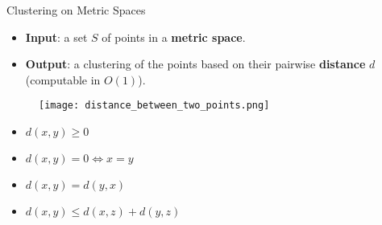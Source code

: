 \documentclass[aspectratio=169]{beamer}
\begin{document}
\begin{frame}{Clustering on Metric Spaces}

    \begin{itemize}
        \item \textbf{Input}: a set $S$ of points in a \textbf{metric space}.
        \item \textbf{Output}: a clustering of the points based on their pairwise \textbf{distance} $d$ (computable in $O(1)$).
    \end{itemize}
    \begin{minipage}[c]{0.4\textwidth}
        \begin{figure}
            \centering
            \texttt{[image: distance\_between\_two\_points.png]}
        \end{figure}
    \end{minipage}
    \begin{minipage}[c]{0.55\textwidth}
    \begin{tcolorbox}
        \begin{itemize}
            \item $d(x, y) \ge 0$
            \item $d(x,y) = 0 \iff x = y$
            \item $d(x,y) = d(y,x)$
            \item $d(x,y)\le d(x,z) + d(y,z)$
        \end{itemize}
    \end{tcolorbox}
    \end{minipage}


\end{frame}
\begin{comment}
    


\begin{frame}{Clustering Types}

Numerous types of clustering:

\begin{figure}
        \centering
        \texttt{[image: clusteringtypes.jpg]}
        \label{fig:enter-label}
    \end{figure}

        Focus of the presentation: \textbf{density-based} ones.\\

    \vspace{0.5cm}

\end{frame}
\end{comment}
\end{document}
